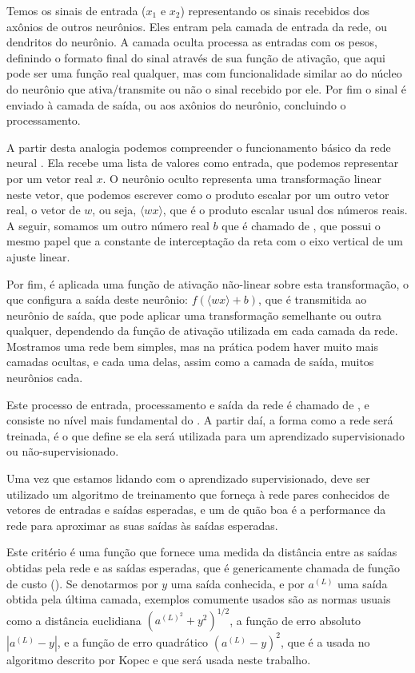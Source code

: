 Temos os sinais de entrada ($x_1$ e $x_2$) representando os sinais recebidos dos axônios de outros neurônios. Eles entram pela camada de entrada da rede, ou dendritos do neurônio. A camada oculta processa as entradas com os pesos, definindo o formato final do sinal através de sua função de ativação, que aqui pode ser uma função real qualquer, mas com funcionalidade similar ao do núcleo do neurônio que ativa/transmite ou não o sinal recebido por ele. Por fim o sinal é enviado à camada de saída, ou aos axônios do neurônio, concluindo o processamento.

A partir desta analogia podemos compreender o funcionamento básico da rede neural . Ela recebe uma lista de valores como entrada, que podemos representar por um vetor real $x$. O neurônio oculto representa uma transformação linear neste vetor, que podemos escrever como o produto escalar por um outro vetor real, o vetor de  $w$, ou seja, $\langle w x \rangle$, que é o produto escalar usual dos números reais. A seguir, somamos um outro número real $b$ que é chamado de , que possui o mesmo papel que a constante de interceptação da reta com o eixo vertical de um ajuste linear.

Por fim, é aplicada uma função de ativação não-linear sobre esta transformação, o que configura a saída deste neurônio: $f(\langle w x \rangle + b)$, que é transmitida ao neurônio de saída, que pode aplicar uma transformação semelhante ou outra qualquer, dependendo da função de ativação utilizada em cada camada da rede. Mostramos uma rede bem simples, mas na prática podem haver muito mais camadas ocultas, e cada uma delas, assim como a camada de saída, muitos neurônios cada.

Este processo de entrada, processamento e saída da rede é chamado de , e consiste no nível mais fundamental do . A partir daí, a forma como a rede será treinada, é o que define se ela será utilizada para um aprendizado supervisionado ou não-supervisionado.

Uma vez que estamos lidando com o aprendizado supervisionado, deve ser utilizado um algoritmo de treinamento que forneça à rede pares conhecidos de vetores de entradas e saídas esperadas, e um  de quão boa é a performance da rede para aproximar as suas saídas às saídas esperadas.

Este critério é uma função que fornece uma medida da distância entre as saídas obtidas pela rede e as saídas esperadas, que é genericamente chamada de função de custo (). Se denotarmos por $y$ uma saída conhecida, e por $a^{(L)}$ uma saída obtida pela última camada, exemplos comumente usados são as normas usuais como a distância euclidiana $(a^{(L)^2} + y^2)^{1/2}$, a função de erro absoluto $|a^{(L)} - y|$, e a função de erro quadrático $(a^{(L)} - y)^2$, que é a usada no algoritmo descrito por Kopec \citep{classic} e que será usada neste trabalho.

